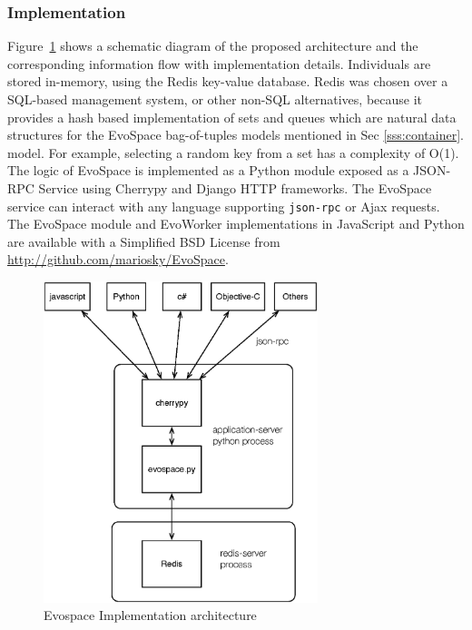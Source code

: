 \subsubsection{Implementation}
Figure~\ref{fig:evospace} shows a schematic diagram of the proposed architecture and the corresponding information flow with implementation details.
Individuals are stored in-memory, using the Redis key-value
database. 
Redis was chosen over a SQL-based management system, or other non-SQL
alternatives, because it provides a hash based implementation of sets
and queues which are natural data structures for the EvoSpace
bag-of-tuples models mentioned in Sec \ref{sss:container}. 
model. For example, selecting a random key from a set has a complexity
of O(1). The logic of EvoSpace is implemented as a Python module
exposed as a  
JSON-RPC Service using Cherrypy and Django HTTP frameworks.
The EvoSpace service %
can interact with any language supporting {\tt json-rpc} or Ajax requests. The EvoSpace module and EvoWorker implementations in JavaScript and Python are available with a Simplified BSD License from \url{http://github.com/mariosky/EvoSpace}.

\begin{figure}[t]
    \centering
        \includegraphics[width=8cm]{evospace.eps}
    \caption{Evospace Implementation architecture } %
    \label{fig:evospace}
\end{figure}

